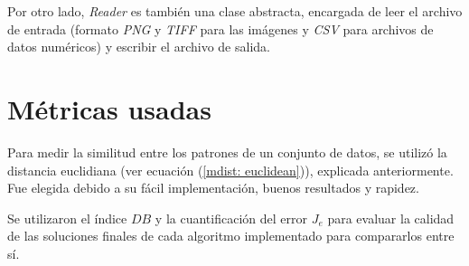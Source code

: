 Por otro lado, \emph{Reader} es también una clase abstracta, encargada de leer
el archivo de entrada (formato \emph{PNG} y \emph{TIFF} para las imágenes y
\emph{CSV} para archivos de datos numéricos) y escribir el archivo de salida.

\section{Métricas usadas}  \label{sect:meusada}

    Para medir la similitud entre los patrones de un conjunto de datos, se utilizó
la distancia euclidiana (ver ecuación (\ref{mdist: euclidean})), explicada
anteriormente. Fue elegida debido a su fácil implementación, buenos resultados y
rapidez.

    Se utilizaron el índice $DB$ y la cuantificación del error $J_e$ para evaluar la 
calidad de las soluciones finales de cada algoritmo implementado para compararlos
entre sí.

